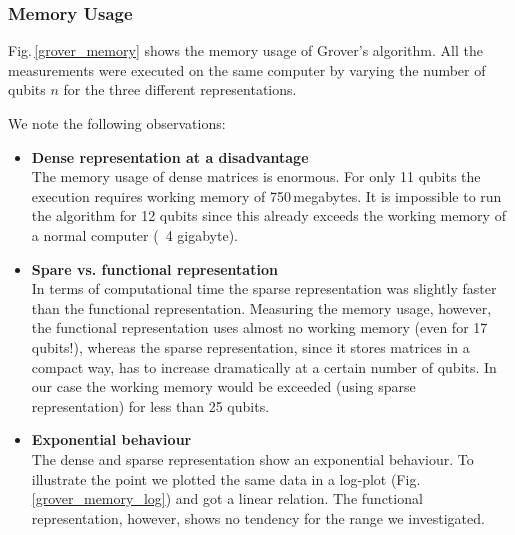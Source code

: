 \documentclass[bibliography=totocnumbered, 10pt]{article}
\theoremstyle{NoticeStyle}
\begin{document}
\subsubsection{Memory Usage}

Fig.\,\ref{grover_memory} shows the memory usage of Grover's algorithm. All the measurements were executed on the same computer by varying the number of qubits $n$ for the three different representations.

We note the following observations:
\begin{itemize}
	\item\textbf{Dense representation at a disadvantage}\\
	The memory usage of dense matrices is enormous. For only 11 qubits the execution requires working memory of 750\,megabytes. It is impossible to run the algorithm for 12 qubits since this already exceeds the working memory of a normal computer (~4 gigabyte).
	\item\textbf{Spare vs. functional representation}\\
	In terms of computational time the sparse representation was slightly faster than the functional representation. Measuring the memory usage, however, the functional representation uses almost no working memory (even for 17 qubits!), whereas the sparse representation, since it stores matrices in a compact way, has to increase dramatically at a certain number of qubits. In our case the working memory would be exceeded (using sparse representation) for less than 25 qubits.
	\item\textbf{Exponential behaviour}\\
	The dense and sparse representation show an exponential behaviour. To illustrate the point we plotted the same data in a log-plot (Fig.\,\ref{grover_memory_log}) and got a linear relation. The functional representation, however, shows no tendency for the range we investigated.
\end{itemize}
\end{document}
